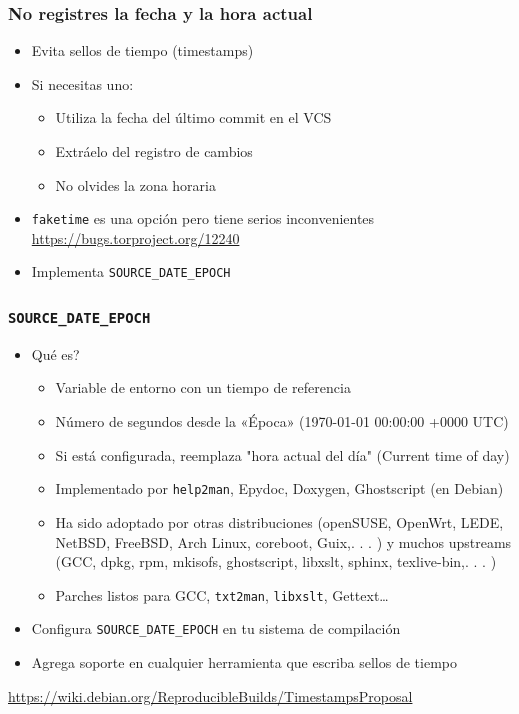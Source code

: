 \documentclass[14pt,aspectratio=169]{beamer}
\begin{document}
\begin{frame}
 \frametitle{No registres la fecha y la hora actual}

 \begin{itemize}
  \item Evita sellos de tiempo (timestamps)
  \item<2-> Si necesitas uno:
    \begin{itemize}
      \item Utiliza la fecha del último commit en el VCS
      \item Extráelo del registro de cambios
      \item<3-> \alert{No olvides la zona horaria}
    \end{itemize}
  \item<4-> \texttt{faketime} es una opción pero tiene serios inconvenientes \\
    {\small \url{https://bugs.torproject.org/12240}}
  \item<5> Implementa \texttt{SOURCE\_DATE\_EPOCH}
 \end{itemize}
\end{frame}

\begin{frame}
 \frametitle{\texttt{SOURCE\_DATE\_EPOCH}}

 \begin{itemize}
   \item Qué es?
     \begin{itemize}
       \item Variable de entorno con un tiempo de referencia
       \item Número de segundos desde la «Época» (1970-01-01 00:00:00 +0000 UTC)
       \item Si está configurada, reemplaza "hora actual del día" (Current time of day)
       \item Implementado por \texttt{help2man}, Epydoc, Doxygen, Ghostscript (en Debian)
       \item Ha sido adoptado por otras distribuciones (openSUSE, OpenWrt,
LEDE, NetBSD, FreeBSD, Arch Linux, coreboot, Guix,. . . ) y
muchos upstreams (GCC, dpkg, rpm, mkisofs, ghostscript, libxslt,
sphinx, texlive-bin,. . . )
       \item Parches listos para GCC, \texttt{txt2man}, \texttt{libxslt}, Gettext…
     \end{itemize}
   \item<2-> Configura \texttt{SOURCE\_DATE\_EPOCH} en tu sistema de compilación
   \item<3> Agrega soporte en cualquier herramienta que escriba sellos de tiempo
 \end{itemize}

 \begin{center}
   {\small \url{https://wiki.debian.org/ReproducibleBuilds/TimestampsProposal}}
 \end{center}
\end{frame}
\end{document}
